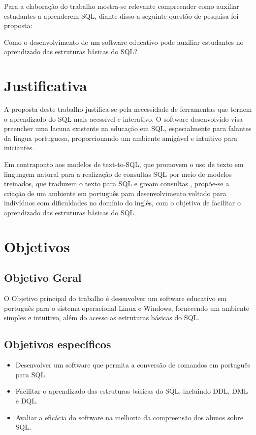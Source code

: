 Para a elaboração do trabalho mostra-se relevante compreender como auxiliar
estudantes a aprenderem SQL, diante disso a seguinte questão de pesquisa foi
proposta:

Como o desenvolvimento de um software educativo pode auxiliar estudantes no
aprendizado das estruturas básicas do SQL?

\section{Justificativa}
A proposta deste trabalho justifica-se pela necessidade de ferramentas que
tornem o aprendizado do SQL mais acessível e interativo. O software
desenvolvido visa preencher uma lacuna existente na educação em SQL,
especialmente para falantes da língua portuguesa, proporcionando um ambiente
amigável e intuitivo para iniciantes.

Em contraponto aos modelos de text-to-SQL, que promovem o uso de texto em
linguagem natural para a realização de consultas SQL por meio de modelos
treinados, que traduzem o texto para SQL e gream consultas \cite{Jose2023},
propõe-se a criação de um ambiente em português para desenvolvimento voltado
para indivíduos com dificuldades no domínio do inglês, com o objetivo de
facilitar o aprendizado das estruturas básicas do SQL.



\section{Objetivos}

\subsection{Objetivo Geral}

O Objetivo principal do trabalho é desenvolver um software educativo em
português para o sistema operacional Linux e Windows, fornecendo um ambiente
simples e intuitivo, além do acesso as estruturas básicas do SQL.

\subsection{Objetivos específicos}
\begin{itemize}
   \item Desenvolver um software que permita a conversão de comandos em português para
         SQL.
   \item Facilitar o aprendizado das estruturas básicas do SQL, incluindo DDL, DML e
         DQL.
   \item Avaliar a eficácia do software na melhoria da compreensão dos alunos sobre SQL.
\end{itemize}

